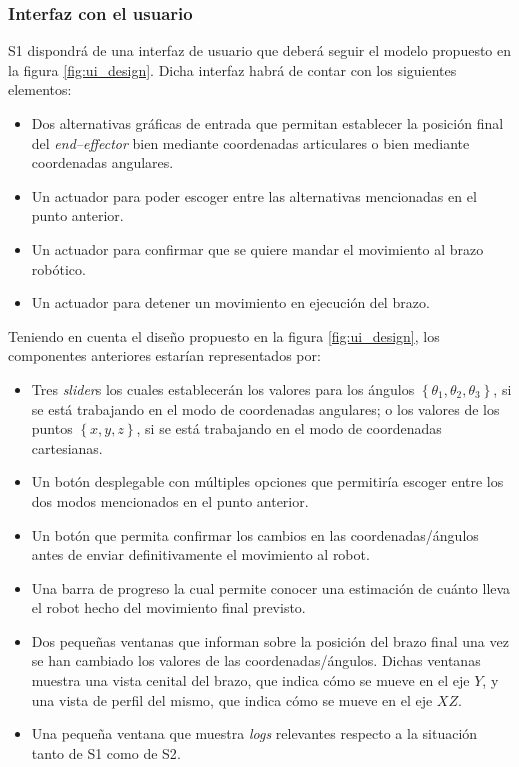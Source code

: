 \subsubsection{Interfaz con el usuario}
\label{sec:ui_reqs}
\ac{S1} dispondrá de una interfaz de usuario que deberá seguir el modelo propuesto en la figura \ref{fig:ui_design}. Dicha interfaz habrá de contar con los siguientes elementos:
\begin{itemize}
    \item Dos alternativas gráficas de entrada que permitan establecer la posición final del \textit{end--effector} bien mediante coordenadas articulares o bien mediante coordenadas angulares.
    \item Un actuador para poder escoger entre las alternativas mencionadas en el punto anterior.
    \item Un actuador para confirmar que se quiere mandar el movimiento al brazo robótico.
    \item Un actuador para detener un movimiento en ejecución del brazo.
\end{itemize}

Teniendo en cuenta el diseño propuesto en la figura \ref{fig:ui_design}, los componentes anteriores estarían
representados por:

\begin{itemize}
    \item Tres \textit{slider}s los cuales establecerán los valores para los ángulos 
    $\left\{\theta_1, \theta_2, \theta_3\right\}$, si se está trabajando en el modo de coordenadas
    angulares; o los valores de los puntos $\left\{x, y, z\right\}$, si se está trabajando en el modo
    de coordenadas cartesianas.
    \item Un botón desplegable con múltiples opciones que permitiría escoger entre los dos modos
    mencionados en el punto anterior.
    \item Un botón que permita confirmar los cambios en las coordenadas/ángulos antes de enviar
    definitivamente el movimiento al robot.
    \item Una barra de progreso la cual permite conocer una estimación de cuánto lleva el robot hecho
    del movimiento final previsto.
    \item Dos pequeñas ventanas que informan sobre la posición del brazo final una vez se han
    cambiado los valores de las coordenadas/ángulos. Dichas ventanas muestra una vista cenital del
    brazo, que indica cómo se mueve en el eje $Y$, y una vista de perfil del mismo, que indica cómo
    se mueve en el eje $XZ$.
    \item Una pequeña ventana que muestra \textit{logs} relevantes respecto a la situación tanto
    de \ac{S1} como de \ac{S2}.
\end{itemize}